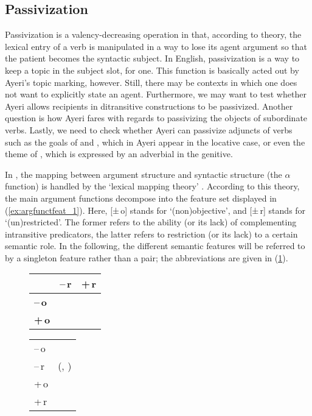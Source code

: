 \subsection{Passivization}
\label{subsubsec:valdecr}

Passivization is a valency-decreasing operation in that, according to \Lfg{}
theory, the lexical entry of a verb is manipulated in a way to lose its agent
argument so that the patient becomes the syntactic subject. In English,
passivization is a way to keep a topic in the subject slot, for one. This
function is basically acted out by Ayeri's topic marking, however. Still, there
may be contexts in which one does not want to explicitly state an agent.
Furthermore, we may want to test whether Ayeri allows recipients in
ditransitive constructions to be passivized. Another question is how Ayeri
fares with regards to passivizing the objects of subordinate verbs. Lastly, we
need to check whether Ayeri can passivize adjuncts of verbs such as the goals
of  and , which in Ayeri
appear in the locative case, or even the theme of , which is
expressed by an adverbial in the genitive.

In \Lfg{}, the mapping between argument structure and syntactic structure (the
$\alpha$ function) is handled by the `lexical mapping theory'
\citep[324\psqq]{bresnan2016}. According to this theory, the main argument
functions decompose into the feature set displayed in
(\ref{ex:argfunctfeat_1}). Here, [±\,o] stands for `(non)objective', and [±\,r]
stands for `(un)restricted'. The former refers to the ability (or its lack) of
complementing intransitive predicators, the latter refers to restriction (or
its lack) to a certain semantic role. In the following, the different semantic
features will be referred to by a singleton feature rather than a pair; the
abbreviations are given in (\ref{ex:argfunctfeat_2}).

\begin{figure}
\pex\label{ex:argfunctfeat}
\a\label{ex:argfunctfeat_1}%
	\begin{tabu}[t]{>{\bfseries}l c c}
	& \textbf{–\,r}
	& \textbf{+\,r}
	\\

	\midrule

	–\,o
	& \Subj
	& \Oblique
	\\

	+\,o
	& \Obj
	& \SObj
	\\

	\bottomrule
	\end{tabu}

\a\label{ex:argfunctfeat_2}%
	\begin{tabular}[t]{@{} l @{\quad$\mapsto$\quad} l}
	–\,o	&	\Subj\\
	–\,r	&	\Obj(, \Subj)\\
	+\,o	&	\SObj\\
	+\,r	&	\Oblique\\
	\end{tabular}
\xe
\end{figure}

